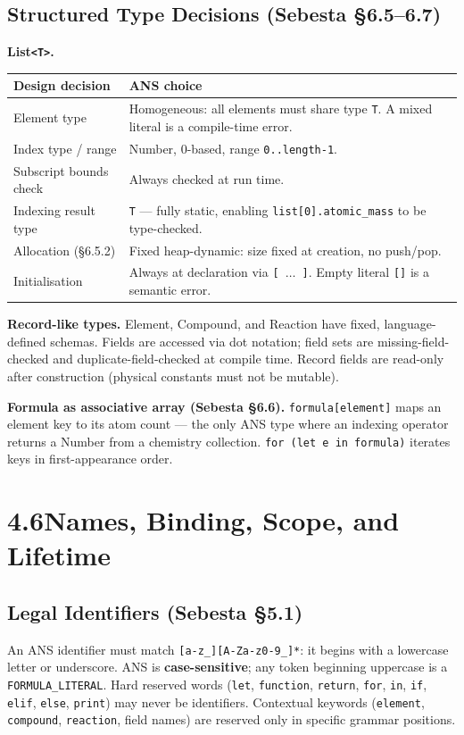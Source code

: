 \documentclass[11pt,a4paper]{article}
\newcommand{\code}[1]{\texttt{#1}}
\begin{document}
\subsection{Structured Type Decisions (Sebesta \S6.5--6.7)}

\textbf{List\texttt{<T>}.}

\begin{tabularx}{\textwidth}{@{} L{3.8cm} Y @{}}
\toprule
\textbf{Design decision} & \textbf{ANS choice} \\
\midrule
Element type & Homogeneous: all elements must share type \code{T}. A mixed literal is a compile-time error. \\
Index type / range & Number, 0-based, range \code{0..length-1}. \\
Subscript bounds check & Always checked at run time. \\
Indexing result type & \code{T} --- fully static, enabling \code{list[0].atomic\_mass} to be type-checked. \\
Allocation (§6.5.2) & Fixed heap-dynamic: size fixed at creation, no push/pop. \\
Initialisation & Always at declaration via \code{[ $\ldots$ ]}. Empty literal \code{[]} is a semantic error. \\
\bottomrule
\end{tabularx}

\vspace{4pt}
\textbf{Record-like types.} Element, Compound, and Reaction have fixed, language-defined schemas. Fields are accessed via dot notation; field sets are missing-field-checked and duplicate-field-checked at compile time. Record fields are read-only after construction (physical constants must not be mutable).

\textbf{Formula as associative array (Sebesta \S6.6).} \code{formula[element]} maps an element key to its atom count --- the only ANS type where an indexing operator returns a Number from a chemistry collection. \code{for (let e in formula)} iterates keys in first-appearance order.

\newpage
\section{4.6\quad Names, Binding, Scope, and Lifetime}

\subsection{Legal Identifiers (Sebesta \S5.1)}
An ANS identifier must match \code{[a-z\_][A-Za-z0-9\_]*}: it begins with a lowercase letter or underscore. ANS is \textbf{case-sensitive}; any token beginning uppercase is a \code{FORMULA\_LITERAL}. Hard reserved words (\code{let}, \code{function}, \code{return}, \code{for}, \code{in}, \code{if}, \code{elif}, \code{else}, \code{print}) may never be identifiers. Contextual keywords (\code{element}, \code{compound}, \code{reaction}, field names) are reserved only in specific grammar positions.
\end{document}
